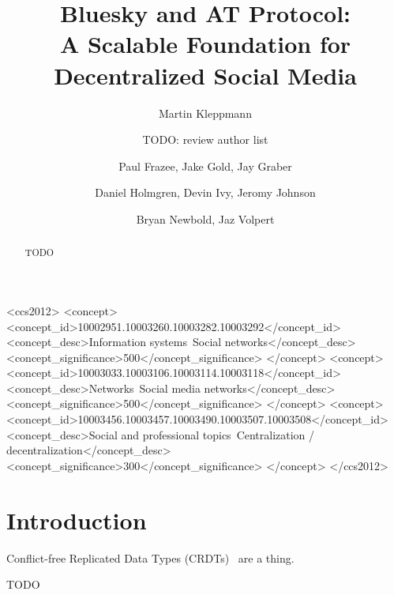 \documentclass[sigconf,review]{acmart}
\begin{document}
\title{Bluesky and AT Protocol:\\ A Scalable Foundation for Decentralized Social Media}
\author{Martin Kleppmann}

\author{TODO: review author list}
\author{Paul Frazee, Jake Gold, Jay Graber}
\author{Daniel Holmgren, Devin Ivy, Jeromy Johnson}
\author{Bryan Newbold, Jaz Volpert}

\begin{abstract}
TODO
\end{abstract}

\begin{CCSXML}
<ccs2012>
   <concept>
       <concept_id>10002951.10003260.10003282.10003292</concept_id>
       <concept_desc>Information systems~Social networks</concept_desc>
       <concept_significance>500</concept_significance>
   </concept>
   <concept>
       <concept_id>10003033.10003106.10003114.10003118</concept_id>
       <concept_desc>Networks~Social media networks</concept_desc>
       <concept_significance>500</concept_significance>
   </concept>
   <concept>
       <concept_id>10003456.10003457.10003490.10003507.10003508</concept_id>
       <concept_desc>Social and professional topics~Centralization / decentralization</concept_desc>
       <concept_significance>300</concept_significance>
   </concept>
 </ccs2012>
\end{CCSXML}


\maketitle

\section{Introduction}

Conflict-free Replicated Data Types (CRDTs)~\cite{Shapiro:2011} are a thing.

\begin{acks}
TODO
\end{acks}



\end{document}
